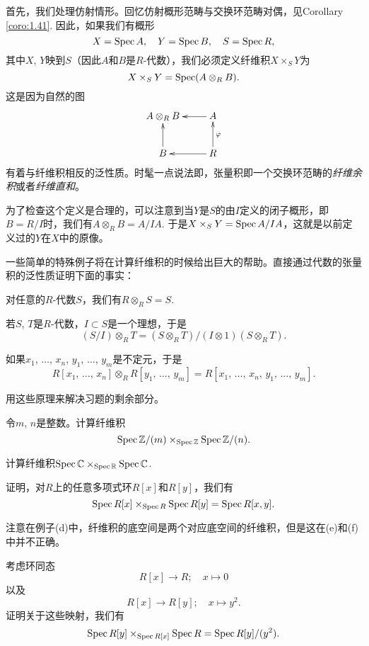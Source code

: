 首先，我们处理仿射情形。回忆仿射概形范畴与交换环范畴对偶，见Corollary \ref{coro:1.41}. 因此，如果我们有概形
\[
	X=\operatorname{Spec} A,\quad Y=\operatorname{Spec} B,\quad S=\operatorname{Spec} R,
\]
其中$X$, $Y$映到$S$（因此$A$和$B$是$R$\hyp 代数），我们必须定义纤维积$X\times_S Y$为
\[
	X\times_S Y=\operatorname{Spec}(A\otimes_R B).
\]
这是因为自然的图
\[
	\xymatrix{
	A\otimes_R B&A\ar[l]\\
	B\ar[u]&R\ar[l]\ar[u]_\varphi
	}
\]
有着与纤维积相反的泛性质。时髦一点说法即，张量积即一个交换环范畴的\textit{纤维余积}或者\textit{纤维直和}。

为了检查这个定义是合理的，可以注意到当$Y$是$S$的由$I$定义的闭子概形，即$B=R/I$时，我们有$A\otimes_R B=A/IA$. 于是$X\times_S Y=\operatorname{Spec} A/IA$，这就是以前定义过的$Y$在$X$中的原像。

\begin{exe}\label{exe:1.46}
一些简单的特殊例子将在计算纤维积的时候给出巨大的帮助。直接通过代数的张量积的泛性质证明下面的事实：

\begin{compactenum}[(a)]
\item 对任意的$R$\hyp 代数$S$，我们有$R\otimes_R S=S$.
\item 若$S$, $T$是$R$\hyp 代数，$I\subset S$是一个理想，于是
\[
	(S/I)\otimes_R T=(S\otimes_R T)/(I\otimes 1)(S\otimes_R T).
\]
\item 如果$x_1$, $\dots$, $x_n$, $y_1$, $\dots$, $y_m$是不定元，于是
\[
	R[\text{$x_1$, $\dots$, $x_n$}]\otimes_R R[\text{$y_1$, $\dots$, $y_m$}]=R[\text{$x_1$, $\dots$, $x_n$, $y_1$, $\dots$, $y_m$}].
\]
\end{compactenum}
用这些原理来解决习题的剩余部分。
\begin{compactenum}[(a)] \setcounter{enumi}{3}
\item 令$m$, $n$是整数。计算纤维积
\[
	\operatorname{Spec} \mathbb{Z}/(m)\times_{\operatorname{Spec} \mathbb{Z}} \operatorname{Spec} \mathbb{Z}/(n).
\]
\item 计算纤维积$\operatorname{Spec} \mathbb{C} \times_{\operatorname{Spec} \mathbb{R}} \operatorname{Spec} \mathbb{C}$.
\item 证明，对$R$上的任意多项式环$R[x]$和$R[y]$，我们有
\[
	\operatorname{Spec} R[x]\times_{\operatorname{Spec} R}\operatorname{Spec} R[y]=\operatorname{Spec} R[x,y].
\]
\end{compactenum}
注意在例子(d)中，纤维积的底空间是两个对应底空间的纤维积，但是这在(e)和(f)中并不正确。
\begin{compactenum}[(a)] \setcounter{enumi}{6}
\item 考虑环同态
\[
	R[x]\to R;\quad x\mapsto 0
\]
以及
\[
	R[x]\to R[y];\quad x\mapsto y^2.
\]
证明关于这些映射，我们有
\[
	\operatorname{Spec} R[y]\times_{\operatorname{Spec} R[x]}\operatorname{Spec} R=\operatorname{Spec} R[y]/(y^2).
\]
\end{compactenum}
\end{exe}

